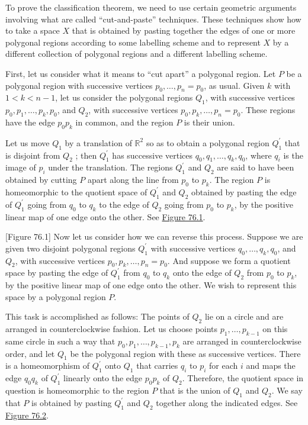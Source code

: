 To prove the classification theorem, we need to use certain geometric arguments involving what are called ``cut-and-paste'' techniques. These techniques show how to take a space \(X\) that is obtained by pasting together the edges of one or more polygonal regions according to some labelling scheme and to represent \(X\) by a different collection of polygonal regions and a different labelling scheme.

First, let us consider what it means to ``cut apart'' a polygonal region. Let \(P\) be a polygonal region with successive vertices \(p_{0},\ldots ,p_{n} = p_{0}\), as usual. Given \(k\) with \(1 < k < n - 1\), let us consider the polygonal regions \(Q_{1}\), with successive vertices \(p_{0},p_{1},\ldots ,p_{k},p_{0}\), and \(Q_{2}\), with successive vertices \(p_{0},p_{k},\ldots ,p_{n} = p_{0}\). These regions have the edge \(p_{0}p_{k}\) in common, and the region \(P\) is their union.

Let us move \(Q_{1}\) by a translation of \(\mathbb{R}^{2}\) so as to obtain a polygonal region \(Q_1^{\prime }\) that is disjoint from \(Q_{2}\) ; then \(Q_1^{\prime }\) has successive vertices \(q_{0},q_{1},\ldots ,q_{k},q_{0}\), where \(q_{i}\) is the image of \(p_{i}\) under the translation. The regions \(Q_1^{\prime }\) and \(Q_{2}\) are said to have been obtained by cutting \(P\) apart along the line from \(p_{0}\) to \(p_{k}\). The region \(P\) is homeomorphic to the quotient space of \(Q_1^{\prime }\) and \(Q_{2}\) obtained by pasting the edge of \(Q_1^{\prime }\) going from \(q_{0}\) to \(q_{k}\) to the edge of \(Q_{2}\) going from \(p_{0}\) to \(p_{k}\), by the positive linear map of one edge onto the other. See \hyperref[fig:76.1]{Figure 76.1}.

[Figure 76.1]
Now let us consider how we can reverse this process. Suppose we are given two disjoint polygonal regions \(Q_1^{\prime }\) with successive vertices \(q_{0},\ldots ,q_{k},q_{0}\), and \(Q_{2}\), with successive vertices \(p_{0},p_{k},\ldots ,p_{n} = p_{0}\). And suppose we form a quotient space by pasting the edge of \(Q_1^{\prime }\) from \(q_{0}\) to \(q_{k}\) onto the edge of \(Q_{2}\) from \(p_{0}\) to \(p_{k}\), by the positive linear map of one edge onto the other. We wish to represent this space by a polygonal region \(P\).

This task is accomplished as follows: The points of \(Q_{2}\) lie on a circle and are arranged in counterclockwise fashion. Let us choose points \(p_{1},\ldots ,p_{k - 1}\) on this same circle in such a way that \(p_{0},p_{1},\ldots ,p_{k - 1},p_{k}\) are arranged in counterclockwise order, and let \(Q_{1}\) be the polygonal region with these as successive vertices. There is a homeomorphism of \(Q_1^{\prime }\) onto \(Q_{1}\) that carries \(q_{i}\) to \(p_{i}\) for each \(i\) and maps the edge \(q_{0}q_{k}\) of \(Q_1^{\prime }\) linearly onto the edge \(p_{0}p_{k}\) of \(Q_{2}\). Therefore, the quotient space in question is homeomorphic to the region \(P\) that is the union of \(Q_{1}\) and \(Q_{2}\). We say that \(P\) is obtained by pasting \(Q_1^{\prime }\) and \(Q_{2}\) together along the indicated edges. See \hyperref[fig:76.2]{Figure 76.2}.

